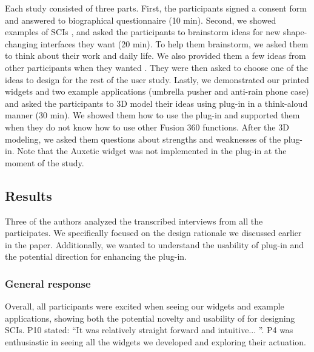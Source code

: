       Each study consisted of three parts. First, the participants signed a
      consent form and answered to biographical questionnaire (10 min). Second,
      we showed examples of SCIs \cite{10.1145/2501988.2502032, Yao:2013bg}, and
      asked the participants to brainstorm ideas for new shape-changing
      interfaces they want (20 min). To help them brainstorm, we asked them to
      think about their work and daily life. We also provided them a few ideas
      from other participants when they wanted \cite{10.1145/2675133.2675239}.
      They were then asked to choose one of the ideas to design for the rest of
      the user study.  Lastly, we demonstrated our printed widgets and two
      example applications (umbrella pusher and anti-rain phone case) and asked
      the participants to 3D model their ideas using \mp plug-in in a
      think-aloud manner (30 min). We showed them how to use the plug-in and
      supported them when they do not know how to use other Fusion 360
      functions. After the 3D modeling, we asked them questions about strengths
      and weaknesses of the \mp plug-in. Note that the Auxetic widget was not
      implemented in the plug-in at the moment of the study.

    \subsection{Results}
      Three of the authors analyzed the transcribed interviews from all the
      participates. We specifically focused on the design rationale we discussed
      earlier in the paper. Additionally, we wanted to understand the usability
      of \mp plug-in and the potential direction for enhancing the plug-in.
          
      \subsubsection{General response}
        Overall, all participants were excited when seeing our widgets and
        example applications, showing both the potential novelty and usability
        of \mp for designing SCIs. P10 stated: ``It was relatively straight
        forward and intuitive... ''. P4 was enthusiastic in seeing all the
        widgets we developed and exploring their actuation. 
        
